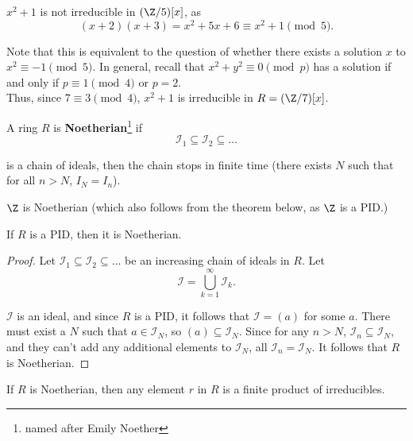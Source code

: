 \documentclass[11pt]{article}
\begin{document}
\begin{answer}
$x^2 + 1$ is not irreducible in $(\Z / 5)[x]$, as 
\[
    (x+2)(x+3) = x^2 + 5x + 6 \equiv x^2 + 1 \pmod 5.
\]

Note that this is equivalent to the question of whether there exists a solution $x$ to $x^2 \equiv -1 \pmod 5$. 
In general, recall that $x^2 + y^2 \equiv 0 \pmod p$ has a solution if and only if $p \equiv 1 \pmod 4$ or $p=2$. \\

Thus, since $7 \equiv 3 \pmod 4$, $x^2 + 1$ is irreducible in $R = (\Z / 7)[x]$.
\end{answer}

\begin{definition}
A ring $R$ is \textbf{Noetherian}\footnote{named after Emily Noether} if 
\[
    \mathcal{I}_1 \subseteq \mathcal{I}_2 \subseteq  \dots
\]

is a chain of ideals, then the chain stops in finite time (there exists $N$ such that for all $n > N$, $I_N=I_n$).
\end{definition}

\begin{remark}
$\Z$ is Noetherian (which also follows from the theorem below, as $\Z$ is a PID.)
\end{remark}

\begin{theorem}
If $R$ is a PID, then it is Noetherian.
\end{theorem}

\begin{proof}
Let $\mathcal{I}_1 \subseteq \mathcal{I}_2 \subseteq  \dots$ be an increasing chain of ideals in $R$. Let
\[
    \mathcal{I} = \bigcup_{k=1}^{\infty} \mathcal{I}_k.
\]

$\mathcal{I}$ is an ideal, and since $R$ is a PID, it follows that $\mathcal{I} = (a)$ for some $a$. 
There must exist a $N$ such that $a \in \mathcal{I}_N$, so $(a) \subseteq \mathcal{I}_N$. 
Since for any $n > N$, $\mathcal{I}_n \subseteq \mathcal{I}_N$, and they can't add any additional elements to $\mathcal{I}_N$, all $\mathcal{I}_n = \mathcal{I}_N$. 
It follows that $R$ is Noetherian. 
\end{proof}

\begin{lemma}
If $R$ is Noetherian, then any element $r$ in $R$ is a finite product of irreducibles.
\end{lemma}
\end{document}
